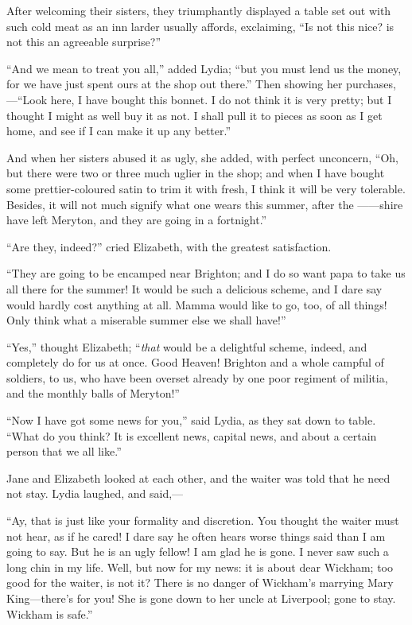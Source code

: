 \documentclass[12pt,openright]{book}
\begin{document}
After welcoming their sisters, they triumphantly displayed a table set out with such cold meat as an inn larder usually affords, exclaiming, “Is not this nice? is not this an agreeable surprise?”

“And we mean to treat you all,” added Lydia; “but you must lend us the money, for we have just spent ours at the shop out there.” Then showing her purchases,—“Look here, I have bought this bonnet. I do not think it is very pretty; but I thought I might as well buy it as not. I shall pull it to pieces as soon as I get home, and see if I can make it up any better.”

And when her sisters abused it as ugly, she added, with perfect unconcern, “Oh, but there were two or three much uglier in the shop; and when I have bought some prettier-coloured satin to trim it with fresh, I think it will be very tolerable. Besides, it will not much signify what one wears this summer, after the ——shire have left Meryton, and they are going in a fortnight.”

“Are they, indeed?” cried Elizabeth, with the greatest satisfaction.

“They are going to be encamped near Brighton; and I do so want papa to take us all there for the summer! It would be such a delicious scheme, and I dare say would hardly cost anything at all. Mamma would like to go, too, of all things! Only think what a miserable summer else we shall have!”

“Yes,” thought Elizabeth; “\textit{that} would be a delightful scheme, indeed, and completely do for us at once. Good Heaven! Brighton and a whole campful of soldiers, to us, who have been overset already by one poor regiment of militia, and the monthly balls of Meryton!”

“Now I have got some news for you,” said Lydia, as they sat down to table. “What do you think? It is excellent news, capital news, and about a certain person that we all like.”

Jane and Elizabeth looked at each other, and the waiter was told that he need not stay. Lydia laughed, and said,—

“Ay, that is just like your formality and discretion. You thought the waiter must not hear, as if he cared! I dare say he often hears worse things said than I am going to say. But he is an ugly fellow! I am glad he is gone. I never saw such a long chin in my life. Well, but now for my news: it is about dear Wickham; too good for the waiter, is not it? There is no danger of Wickham’s marrying Mary King—there’s for you! She is gone down to her uncle at Liverpool; gone to stay. Wickham is safe.”
\end{document}
